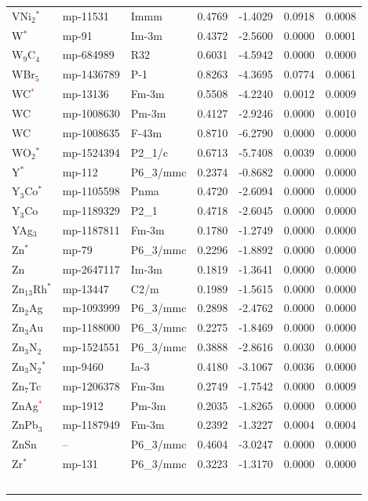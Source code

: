 \begin{longtable}{@{}lllrrrr@{}}
VNi$_{2}$$^*$ & mp-11531 & Immm & 0.4769 & -1.4029 & 0.0918 & 0.0008 \\
W$^*$ & mp-91 & Im-3m & 0.4372 & -2.5600 & 0.0000 & 0.0001 \\
W$_{9}$C$_{4}$ & mp-684989 & R32 & 0.6031 & -4.5942 & 0.0000 & 0.0000 \\
WBr$_{5}$ & mp-1436789 & P-1 & 0.8263 & -4.3695 & 0.0774 & 0.0061 \\
WC\textcolor{red}{$^*$} & mp-13136 & Fm-3m & 0.5508 & -4.2240 & 0.0012 & 0.0009 \\
WC & mp-1008630 & Pm-3m & 0.4127 & -2.9246 & 0.0000 & 0.0010 \\
WC & mp-1008635 & F-43m & 0.8710 & -6.2790 & 0.0000 & 0.0000 \\
WO$_{2}$$^*$ & mp-1524394 & P2\_1/c & 0.6713 & -5.7408 & 0.0039 & 0.0000 \\
Y$^*$ & mp-112 & P6\_3/mmc & 0.2374 & -0.8682 & 0.0000 & 0.0000 \\
Y$_{3}$Co$^*$ & mp-1105598 & Pnma & 0.4720 & -2.6094 & 0.0000 & 0.0000 \\
Y$_{3}$Co & mp-1189329 & P2\_1 & 0.4718 & -2.6045 & 0.0000 & 0.0000 \\
YAg$_{3}$ & mp-1187811 & Fm-3m & 0.1780 & -1.2749 & 0.0000 & 0.0000 \\
Zn$^*$ & mp-79 & P6\_3/mmc & 0.2296 & -1.8892 & 0.0000 & 0.0000 \\
Zn & mp-2647117 & Im-3m & 0.1819 & -1.3641 & 0.0000 & 0.0000 \\
Zn$_{13}$Rh$^*$ & mp-13447 & C2/m & 0.1989 & -1.5615 & 0.0000 & 0.0000 \\
Zn$_{2}$Ag & mp-1093999 & P6\_3/mmc & 0.2898 & -2.4762 & 0.0000 & 0.0000 \\
Zn$_{3}$Au & mp-1188000 & P6\_3/mmc & 0.2275 & -1.8469 & 0.0000 & 0.0000 \\
Zn$_{3}$N$_{2}$ & mp-1524551 & P6\_3/mmc & 0.3888 & -2.8616 & 0.0030 & 0.0000 \\
Zn$_{3}$N$_{2}$$^*$ & mp-9460 & Ia-3 & 0.4180 & -3.1067 & 0.0036 & 0.0000 \\
Zn$_{7}$Tc & mp-1206378 & Fm-3m & 0.2749 & -1.7542 & 0.0000 & 0.0009 \\
ZnAg\textcolor{red}{$^*$} & mp-1912 & Pm-3m & 0.2035 & -1.8265 & 0.0000 & 0.0000 \\
ZnPb$_{3}$ & mp-1187949 & Fm-3m & 0.2392 & -1.3227 & 0.0004 & 0.0004 \\
ZnSn & -- & P6\_3/mmc & 0.4604 & -3.0247 & 0.0000 & 0.0000 \\
Zr$^*$ & mp-131 & P6\_3/mmc & 0.3223 & -1.3170 & 0.0000 & 0.0000 \\
$$
\end{longtable}
